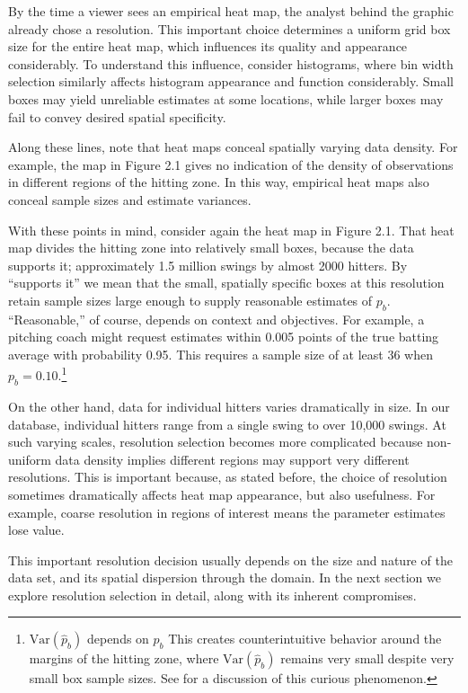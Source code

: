 By the time a viewer sees an empirical heat map, the analyst behind the graphic already chose a resolution. This important choice determines a uniform grid box size for the entire heat map, which influences its quality and appearance considerably. To understand this influence, consider histograms, where bin width selection similarly affects histogram appearance and function considerably. Small boxes may yield unreliable estimates at some locations, while larger boxes may fail to convey desired spatial specificity. 

Along these lines, note that heat maps conceal spatially varying data density. For example, the map in Figure 2.1 gives no indication of the density of observations in different regions of the hitting zone. In this way, empirical heat maps also conceal sample sizes and estimate variances.  

With these points in mind, consider again the heat map in Figure 2.1. That heat map divides the hitting zone into relatively small boxes, because the data supports it; approximately 1.5 million swings by almost 2000 hitters. By ``supports it'' we mean that the small, spatially specific boxes at this resolution retain sample sizes large enough to supply reasonable estimates of $p_{b}$. ``Reasonable,'' of course, depends on context and objectives. For example, a pitching coach might request estimates within 0.005 points of the true batting average with probability 0.95. This requires a sample size of at least 36 when $p_{b} = 0.10$.\footnote{$\text{Var}(\hat{p}_{b})$ depends on $p_{b}$ This creates counterintuitive behavior around the margins of the hitting zone, where $\text{Var}(\hat{p}_{b})$ remains very small despite very small box sample sizes. See \cite{Dixon2005} for a discussion of this curious phenomenon.}

On the other hand, data for individual hitters varies dramatically in size. In our database, individual hitters range from a single swing to over 10,000 swings. At such varying scales, resolution selection becomes more complicated because non-uniform data density implies different regions may support very different resolutions. This is important because, as stated before, the choice of resolution sometimes dramatically affects heat map appearance, but also usefulness. For example, coarse resolution in regions of interest means the parameter estimates lose value. 

This important resolution decision usually depends on the size and nature of the data set, and its spatial dispersion through the domain. In the next section we explore resolution selection in detail, along with its inherent compromises.

